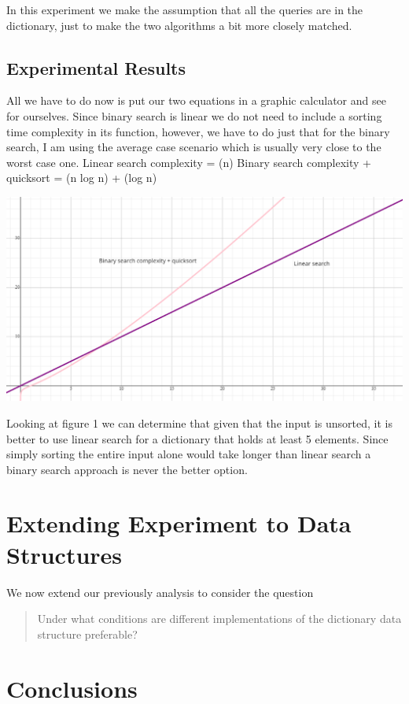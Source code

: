 \documentclass{article}
\begin{document}
In this experiment we make the assumption that all the queries are in the dictionary, just to make the two algorithms a bit more closely matched.


\subsection{Experimental Results}

All we have to do now is put our two equations in a graphic calculator and see for ourselves. Since binary search is linear we do not need to include a sorting time complexity in its function, however, we have to do just that for the binary search, I am using the average case scenario which is usually very close to the worst case one.
Linear search complexity = \theta(n)
Binary search complexity + quicksort = \theta(n log n) + \theta(log n)

\includegraphics{graph1.png}



Looking at figure 1 we can determine that given that the input is unsorted, it is better to use linear search for a dictionary that holds at least 5 elements. Since simply sorting the entire input alone would take longer than linear search a binary search approach is never the better option.



\section{Extending Experiment to Data Structures}
\label{sec:part3}

We now extend our previously analysis to consider the question
\begin{quote}
Under what conditions are different implementations of the dictionary data structure preferable?
\end{quote}

\section{Conclusions}
\label{sec:conclusions}
\end{document}
